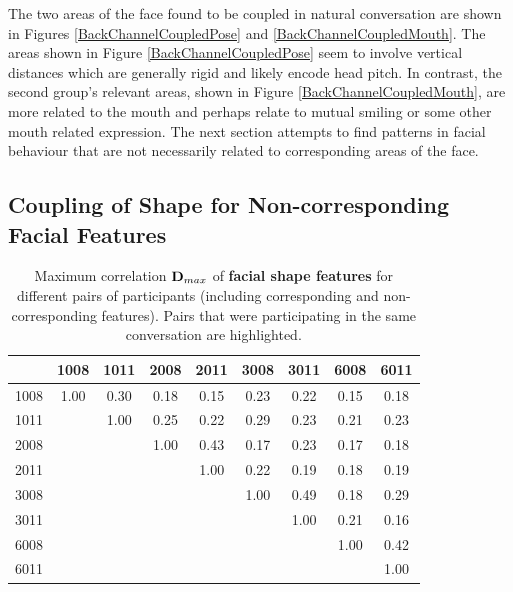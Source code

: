 The two areas of the face found to be coupled in natural conversation are shown in Figures \ref{BackChannelCoupledPose} and \ref{BackChannelCoupledMouth}. The areas shown in Figure \ref{BackChannelCoupledPose} seem to involve vertical distances which are generally rigid and likely encode head pitch. In contrast, the second group's relevant areas, shown in Figure \ref{BackChannelCoupledMouth}, are more related to the mouth and perhaps relate to mutual smiling or some other mouth related expression.
The next section attempts to find patterns in facial behaviour that are not necessarily related to corresponding areas of the face.

\subsection{Coupling of Shape for Non-corresponding Facial Features}

\begin{table}[tb]
\centering
\caption[Maximum correlation $\dyadicCorrelation_{max}$ of \textbf{facial shape features} for different pairs of participants (including corresponding and non-corresponding features).]{Maximum correlation $\dyadicCorrelation_{max}$ of \textbf{facial shape features} for different pairs of participants (including corresponding and non-corresponding features). Pairs that were participating in the same conversation are highlighted.}
\begin{tabular}{ | c | c | c | c | c | c | c | c | c |}
\hline
& 1008 & 1011 & 2008 & 2011 & 3008 & 3011 & 6008 & 6011 \\
\hline
1008 & \cellcolor{orange} 1.00 & \cellcolor{orange} 0.30 & 0.18 & 0.15 & 0.23 & 0.22 & 0.15 & 0.18\\
1011 & \cellcolor{orange} & \cellcolor{orange} 1.00& 0.25& 0.22& 0.29& 0.23& 0.21& 0.23\\
2008 & & & \cellcolor{orange} 1.00& \cellcolor{orange} 0.43& 0.17& 0.23& 0.17& 0.18\\
2011 & & & \cellcolor{orange} & \cellcolor{orange} 1.00 & 0.22& 0.19&0.18 &0.19 \\
3008 & & & & & \cellcolor{orange} 1.00 & \cellcolor{orange} 0.49& 0.18& 0.29\\
3011 & & & & & \cellcolor{orange} & \cellcolor{orange} 1.00& 0.21& 0.16\\
6008 & & & & & & & \cellcolor{orange} 1.00& \cellcolor{orange} 0.42\\
6011 & & & & & & & \cellcolor{orange} & \cellcolor{orange} 1.00\\
\hline
\end{tabular}
\label{TableBackchannelShape}
\end{table}

